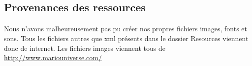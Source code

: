 \subsection{Provenances des ressources}
\paragraph{} Nous n'avons malheureusement pas pu créer nos propres fichiers images, fonts et sons. Tous les fichiers autres que xml présents dans le dossier Resources viennent donc de internet. Les fichiers images viennent tous de \url{http://www.mariouniverse.com/} 
